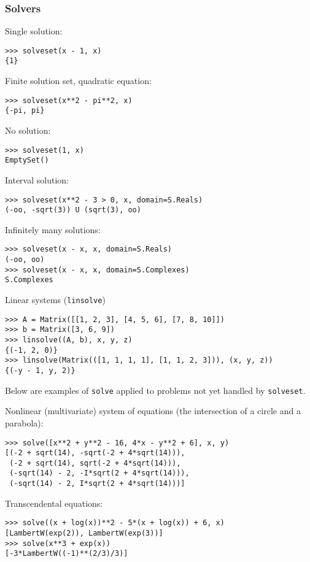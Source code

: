 \subsubsection{Solvers}


\noindent Single solution:
\begin{verbatim}
>>> solveset(x - 1, x)
{1}
\end{verbatim}

\noindent Finite solution set, quadratic equation:
\begin{verbatim}
>>> solveset(x**2 - pi**2, x)
{-pi, pi}
\end{verbatim}

\noindent No solution:
\begin{verbatim}
>>> solveset(1, x)
EmptySet()
\end{verbatim}

\noindent Interval solution:
\begin{verbatim}
>>> solveset(x**2 - 3 > 0, x, domain=S.Reals)
(-oo, -sqrt(3)) U (sqrt(3), oo)
\end{verbatim}

\noindent Infinitely many solutions:
\begin{verbatim}
>>> solveset(x - x, x, domain=S.Reals)
(-oo, oo)
>>> solveset(x - x, x, domain=S.Complexes)
S.Complexes
\end{verbatim}

\noindent Linear systems (\texttt{linsolve})
\begin{verbatim}
>>> A = Matrix([[1, 2, 3], [4, 5, 6], [7, 8, 10]])
>>> b = Matrix([3, 6, 9])
>>> linsolve((A, b), x, y, z)
{(-1, 2, 0)}
>>> linsolve(Matrix(([1, 1, 1, 1], [1, 1, 2, 3])), (x, y, z))
{(-y - 1, y, 2)}
\end{verbatim}

Below are examples of \texttt{solve} applied to problems not yet handled by \texttt{solveset}.

\noindent Nonlinear (multivariate) system of equations (the intersection of a circle
and a parabola):
\begin{verbatim}
>>> solve([x**2 + y**2 - 16, 4*x - y**2 + 6], x, y)
[(-2 + sqrt(14), -sqrt(-2 + 4*sqrt(14))),
 (-2 + sqrt(14), sqrt(-2 + 4*sqrt(14))),
 (-sqrt(14) - 2, -I*sqrt(2 + 4*sqrt(14))),
 (-sqrt(14) - 2, I*sqrt(2 + 4*sqrt(14)))]
\end{verbatim}

\noindent Transcendental equations:
\begin{verbatim}
>>> solve((x + log(x))**2 - 5*(x + log(x)) + 6, x)
[LambertW(exp(2)), LambertW(exp(3))]
>>> solve(x**3 + exp(x))
[-3*LambertW((-1)**(2/3)/3)]
\end{verbatim}

